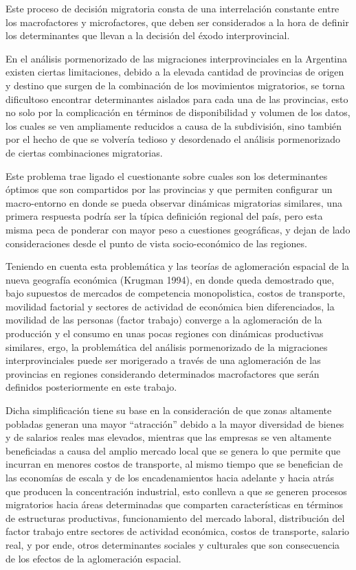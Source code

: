 \documentclass[12pt,a4paper]{article}
\begin{document}
Este proceso de decisión migratoria consta de una interrelación constante entre los macrofactores y microfactores, que deben ser considerados a la hora de definir los determinantes que llevan a la decisión del éxodo interprovincial.

En el análisis pormenorizado de las migraciones interprovinciales en la Argentina existen ciertas  limitaciones, debido a la elevada cantidad de provincias de origen y destino que surgen de la combinación de los movimientos migratorios, se torna dificultoso encontrar determinantes aislados para cada una de las provincias, esto no solo por la complicación en términos de disponibilidad y volumen de los datos, los cuales se ven ampliamente reducidos a causa de la subdivisión, sino también por el hecho de que se volvería tedioso y desordenado el análisis pormenorizado de ciertas combinaciones migratorias.

Este problema trae ligado el cuestionante sobre cuales son los  determinantes óptimos que son compartidos por las  provincias y  que permiten configurar un macro-entorno en donde se pueda  observar dinámicas migratorias similares, una primera respuesta podría ser la típica definición regional del país, pero esta misma peca de ponderar con mayor peso a cuestiones geográficas, y dejan de lado consideraciones desde el punto de vista socio-económico de las regiones.

Teniendo en cuenta esta problemática y las teorías de aglomeración espacial de la nueva geografía económica (Krugman 1994), en donde queda demostrado que, bajo supuestos de mercados de competencia monopolistica, costos de transporte, movilidad factorial y sectores de actividad de económica bien diferenciados, la movilidad de las personas (factor trabajo) converge a la aglomeración de la producción y el consumo en unas pocas regiones con dinámicas productivas similares, ergo, la problemática del análisis pormenorizado de la migraciones interprovinciales puede ser morigerado a través de una aglomeración de las provincias en regiones considerando determinados macrofactores que serán definidos posteriormente en este trabajo. 

Dicha simplificación tiene su base en la consideración de que  zonas altamente pobladas generan una mayor “atracción” debido a la mayor diversidad de bienes y de salarios reales mas elevados, mientras que las empresas se ven altamente beneficiadas a causa del amplio mercado local que se genera lo que permite que incurran en menores costos de transporte, al mismo tiempo que se benefician de las economías de escala y de los encadenamientos hacia adelante y hacia atrás que producen la concentración industrial, esto conlleva a que se generen procesos migratorios hacia áreas determinadas que comparten características en términos de estructuras productivas, funcionamiento del mercado laboral, distribución del factor trabajo entre sectores de actividad económica, costos de transporte, salario real, y por ende, otros determinantes sociales y culturales que son consecuencia de los efectos de la aglomeración espacial.
\end{document}
